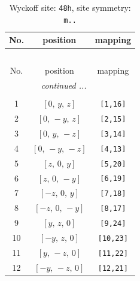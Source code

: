 \documentclass[fleqn,8pt]{jsarticle}
\begin{document}
\begin{longtable}{ccc}
\caption{Wyckoff site: {\tt 48h}, site symmetry: {\tt m..}}
 \\
 \hline \hline
No. & position & mapping \\ \hline \endfirsthead

\multicolumn{2}{l}{\tablename\ \thetable{}} \\
 \hline \hline
No. & position & mapping \\ \hline \endhead

 \hline \hline
\multicolumn{2}{r}{\footnotesize\it continued ...} \\ \endfoot

 \hline \hline
\multicolumn{2}{r}{} \\ \endlastfoot

1 & $\left[ 0,\, y,\, z \right]$ & {\tt [1,16]} \\ \hline
2 & $\left[ 0,\, - y,\, z \right]$ & {\tt [2,15]} \\ \hline
3 & $\left[ 0,\, y,\, - z \right]$ & {\tt [3,14]} \\ \hline
4 & $\left[ 0,\, - y,\, - z \right]$ & {\tt [4,13]} \\ \hline
5 & $\left[ z,\, 0,\, y \right]$ & {\tt [5,20]} \\ \hline
6 & $\left[ z,\, 0,\, - y \right]$ & {\tt [6,19]} \\ \hline
7 & $\left[ - z,\, 0,\, y \right]$ & {\tt [7,18]} \\ \hline
8 & $\left[ - z,\, 0,\, - y \right]$ & {\tt [8,17]} \\ \hline
9 & $\left[ y,\, z,\, 0 \right]$ & {\tt [9,24]} \\ \hline
10 & $\left[ - y,\, z,\, 0 \right]$ & {\tt [10,23]} \\ \hline
11 & $\left[ y,\, - z,\, 0 \right]$ & {\tt [11,22]} \\ \hline
12 & $\left[ - y,\, - z,\, 0 \right]$ & {\tt [12,21]} \\
\end{longtable}
\renewcommand{\arraystretch}{1.2}
\end{document}
